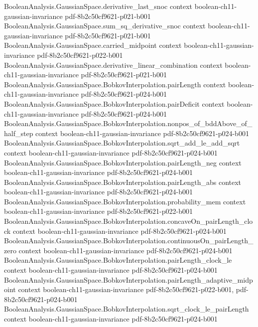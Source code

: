 \begin{theorem}
\proofstep
  {BooleanAnalysis.GaussianSpace.derivative_last_snoc}
  {context}
  {boolean-ch11-gaussian-invariance}
  {pdf-8b2c50cf9621-p021-b001}
\proofstep
  {BooleanAnalysis.GaussianSpace.sum_sq_derivative_snoc}
  {context}
  {boolean-ch11-gaussian-invariance}
  {pdf-8b2c50cf9621-p021-b001}
\proofstep
  {BooleanAnalysis.GaussianSpace.carried_midpoint}
  {context}
  {boolean-ch11-gaussian-invariance}
  {pdf-8b2c50cf9621-p022-b001}
\proofstep
  {BooleanAnalysis.GaussianSpace.derivative_linear_combination}
  {context}
  {boolean-ch11-gaussian-invariance}
  {pdf-8b2c50cf9621-p021-b001}
\proofstep
  {BooleanAnalysis.GaussianSpace.BobkovInterpolation.pairLength}
  {context}
  {boolean-ch11-gaussian-invariance}
  {pdf-8b2c50cf9621-p024-b001}
\proofstep
  {BooleanAnalysis.GaussianSpace.BobkovInterpolation.pairDeficit}
  {context}
  {boolean-ch11-gaussian-invariance}
  {pdf-8b2c50cf9621-p024-b001}
\proofstep
  {BooleanAnalysis.GaussianSpace.BobkovInterpolation.nonpos_of_bddAbove_of_half_step}
  {context}
  {boolean-ch11-gaussian-invariance}
  {pdf-8b2c50cf9621-p024-b001}
\proofstep
  {BooleanAnalysis.GaussianSpace.BobkovInterpolation.sqrt_add_le_add_sqrt}
  {context}
  {boolean-ch11-gaussian-invariance}
  {pdf-8b2c50cf9621-p024-b001}
\proofstep
  {BooleanAnalysis.GaussianSpace.BobkovInterpolation.pairLength_neg}
  {context}
  {boolean-ch11-gaussian-invariance}
  {pdf-8b2c50cf9621-p024-b001}
\proofstep
  {BooleanAnalysis.GaussianSpace.BobkovInterpolation.pairLength_abs}
  {context}
  {boolean-ch11-gaussian-invariance}
  {pdf-8b2c50cf9621-p024-b001}
\proofstep
  {BooleanAnalysis.GaussianSpace.BobkovInterpolation.probability_mem}
  {context}
  {boolean-ch11-gaussian-invariance}
  {pdf-8b2c50cf9621-p022-b001}
\proofstep
  {BooleanAnalysis.GaussianSpace.BobkovInterpolation.concaveOn_pairLength_clock}
  {context}
  {boolean-ch11-gaussian-invariance}
  {pdf-8b2c50cf9621-p024-b001}
\proofstep
  {BooleanAnalysis.GaussianSpace.BobkovInterpolation.continuousOn_pairLength_zero}
  {context}
  {boolean-ch11-gaussian-invariance}
  {pdf-8b2c50cf9621-p024-b001}
\proofstep
  {BooleanAnalysis.GaussianSpace.BobkovInterpolation.pairLength_clock_le}
  {context}
  {boolean-ch11-gaussian-invariance}
  {pdf-8b2c50cf9621-p024-b001}
\proofstep
  {BooleanAnalysis.GaussianSpace.BobkovInterpolation.pairLength_adaptive_midpoint}
  {context}
  {boolean-ch11-gaussian-invariance}
  {pdf-8b2c50cf9621-p022-b001,
    pdf-8b2c50cf9621-p024-b001}
\proofstep
  {BooleanAnalysis.GaussianSpace.BobkovInterpolation.sqrt_clock_le_pairLength}
  {context}
  {boolean-ch11-gaussian-invariance}
  {pdf-8b2c50cf9621-p024-b001}

\end{theorem}
